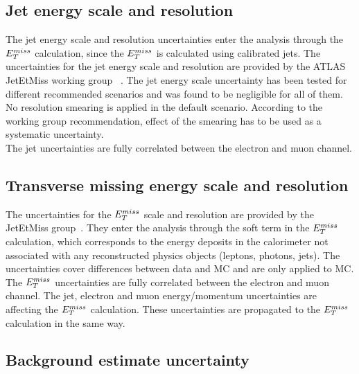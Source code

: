 \subsection{Jet energy scale and resolution}
The jet energy scale and resolution uncertainties enter the analysis through 
the $E_T^{miss}$ calculation, since the $E_T^{miss}$ is calculated using calibrated jets. 
The uncertainties for the jet energy scale and resolution are provided 
by the ATLAS JetEtMiss working group ~\cite{jet_calib_syst_13TeV, JESUncer13TeV}. 
The jet energy scale uncertainty has been tested for different recommended scenarios 
and was found to be negligible for all of them.\\
No resolution smearing is applied in the default scenario. 
According to the working group recommendation, effect of the smearing has to be used as a systematic uncertainty.\\ The jet uncertainties are fully correlated between the electron and muon channel.

\subsection{Transverse missing energy scale and resolution}
The uncertainties for the $E_T^{miss}$ scale and resolution are provided by the JetEtMiss group~\cite{met2015_1}. They enter
the analysis through the soft term in the $E_T^{miss}$ calculation, 
which corresponds to the energy deposits in the calorimeter not associated with
any reconstructed physics objects (leptons, photons, jets).
The uncertainties cover differences between data and MC and are only applied to MC. 
The $E_T^{miss}$ uncertainties are fully correlated between the electron and muon channel. 
The jet, electron and muon energy/momentum uncertainties are affecting the $E_T^{miss}$
calculation. These uncertainties are propagated to the $E_T^{miss}$ calculation in the same way.

\subsection{Background estimate uncertainty}

